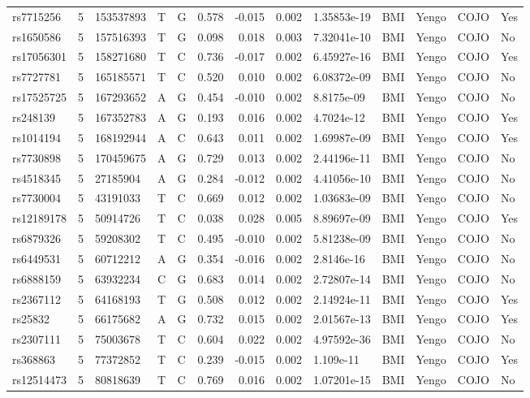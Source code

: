 \documentclass[11pt,twoside]{bristolthesis}
\begin{document}
\begin{longtable}[t]{lrlllrrrlllll}
rs7715256 & 5 & 153537893 & T & G & 0.578 & -0.015 & 0.002 & 1.35853e-19 & BMI & Yengo & COJO & Yes\\
rs1650586 & 5 & 157516393 & T & G & 0.098 & 0.018 & 0.003 & 7.32041e-10 & BMI & Yengo & COJO & No\\
rs17056301 & 5 & 158271680 & T & C & 0.736 & -0.017 & 0.002 & 6.45927e-16 & BMI & Yengo & COJO & Yes\\
\addlinespace
rs7727781 & 5 & 165185571 & T & C & 0.520 & 0.010 & 0.002 & 6.08372e-09 & BMI & Yengo & COJO & No\\
rs17525725 & 5 & 167293652 & A & G & 0.454 & -0.010 & 0.002 & 8.8175e-09 & BMI & Yengo & COJO & No\\
rs248139 & 5 & 167352783 & A & G & 0.193 & 0.016 & 0.002 & 4.7024e-12 & BMI & Yengo & COJO & Yes\\
rs1014194 & 5 & 168192944 & A & C & 0.643 & 0.011 & 0.002 & 1.69987e-09 & BMI & Yengo & COJO & Yes\\
rs7730898 & 5 & 170459675 & A & G & 0.729 & 0.013 & 0.002 & 2.44196e-11 & BMI & Yengo & COJO & No\\
\addlinespace
rs4518345 & 5 & 27185904 & A & G & 0.284 & -0.012 & 0.002 & 4.41056e-10 & BMI & Yengo & COJO & No\\
rs7730004 & 5 & 43191033 & T & C & 0.669 & 0.012 & 0.002 & 1.03683e-09 & BMI & Yengo & COJO & No\\
rs12189178 & 5 & 50914726 & T & C & 0.038 & 0.028 & 0.005 & 8.89697e-09 & BMI & Yengo & COJO & Yes\\
rs6879326 & 5 & 59208302 & T & C & 0.495 & -0.010 & 0.002 & 5.81238e-09 & BMI & Yengo & COJO & No\\
rs6449531 & 5 & 60712212 & A & G & 0.354 & -0.016 & 0.002 & 2.8146e-16 & BMI & Yengo & COJO & No\\
\addlinespace
rs6888159 & 5 & 63932234 & C & G & 0.683 & 0.014 & 0.002 & 2.72807e-14 & BMI & Yengo & COJO & No\\
rs2367112 & 5 & 64168193 & T & G & 0.508 & 0.012 & 0.002 & 2.14924e-11 & BMI & Yengo & COJO & Yes\\
rs25832 & 5 & 66175682 & A & G & 0.732 & 0.015 & 0.002 & 2.01567e-13 & BMI & Yengo & COJO & Yes\\
rs2307111 & 5 & 75003678 & T & C & 0.604 & 0.022 & 0.002 & 4.97592e-36 & BMI & Yengo & COJO & No\\
rs368863 & 5 & 77372852 & T & C & 0.239 & -0.015 & 0.002 & 1.109e-11 & BMI & Yengo & COJO & Yes\\
\addlinespace
rs12514473 & 5 & 80818639 & T & C & 0.769 & 0.016 & 0.002 & 1.07201e-15 & BMI & Yengo & COJO & No\\

\end{longtable}
\end{document}
